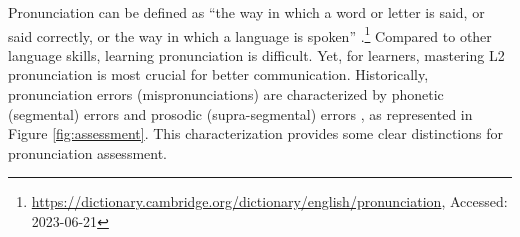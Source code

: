 \documentclass[11pt]{article}
\begin{document}

Pronunciation can be defined as ``the way in which a word or letter is said, or said correctly, or the way in which a language is spoken'' .\footnote{\url{https://dictionary.cambridge.org/dictionary/english/pronunciation}, Accessed: 2023-06-21}
Compared to other language skills, learning pronunciation is difficult. Yet, for learners, mastering L2 pronunciation is most crucial for better communication.
Historically, pronunciation errors (mispronunciations) are characterized by phonetic (segmental) errors and prosodic (supra-segmental) errors \cite{witt2012automatic, nancy2016}, as represented in Figure \ref{fig:assessment}. This characterization provides some clear distinctions for pronunciation assessment. 








\end{document}

